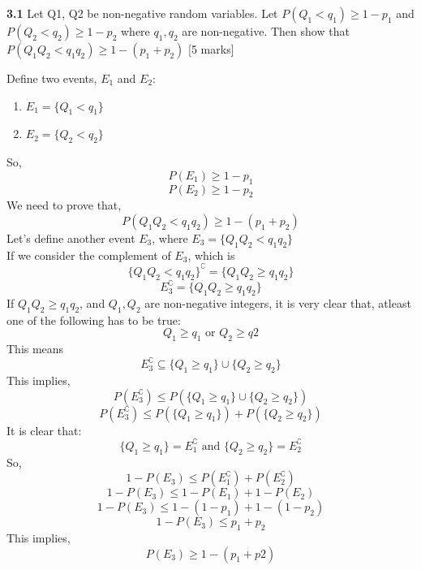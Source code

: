 \begin{que}
	\textbf{3.1} Let Q1, Q2 be non-negative random variables. Let $P(Q_1 < q_1) \geq 1-p_1$ and $P(Q_2 < q_2) \geq 1-p_2$
    where $q_1, q_2$ are non-negative. Then show that $P(Q_1Q_2 < q_1q_2) \geq 1 - (p_1 + p_2)$
	\hspace*{\fill} [5 marks]
\end{que}

\begin{tcolorbox}[breakable]
	\begin{sol}
        Define two events, $E_1$ and $E_2$: \\
        \begin{enumerate}
            \item $E_1=\{Q_1<q_1\}$
            \item $E_2=\{Q_2<q_2\}$
        \end{enumerate}
        So,
        \[P(E_1)\geq 1-p_1\]
        \[P(E_2)\geq 1-p_2\]
        We need to prove that,
        \[ P(Q_1Q_2 < q_1q_2) \geq 1 - (p_1 + p_2)\]
        Let's define another event $E_3$, where $E_3=\{Q_1Q_2 < q_1q_2\}$\\
        If we consider the complement of $E_3$, which is
        \[\{Q_1Q_2 < q_1q_2\}^\complement=\{Q_1Q_2 \geq q_1q_2\}\]
        \[E_3^\complement=\{Q_1Q_2 \geq q_1q_2\}\]
        \clearpage
        If $Q_1Q_2 \geq q_1q_2$, and $Q_1,Q_2$ are non-negative integers, it is very clear that, atleast one of the following has to be true:
        \[Q_1\geq q_1 \text{ or }Q_2\geq q2 \]
        This means \[E_3^\complement \subseteq \{Q_1\geq q_1\}\cup\{Q_2\geq q_2\} \]
        This implies,
        \[P(E_3^\complement)\leq P(\{Q_1\geq q_1\}\cup\{Q_2\geq q_2\} )\]
        \[P(E_3^\complement)\leq P(\{Q_1\geq q_1\})+P(\{Q_2\geq q_2\} )\]
        It is clear that:
        \[\{Q_1\geq q_1\} = E_1^\complement \text{ and } \{Q_2\geq q_2\} = E_2^\complement\]
        So,         
        \[1-P(E_3)\leq P(E_1^\complement) + P(E_2^\complement)\]
        \[1-P(E_3)\leq 1-P(E_1) + 1-P(E_2)\]
        \[1-P(E_3)\leq 1-(1-p_1) + 1-(1-p_2)\]
        \[1-P(E_3)\leq p_1 +p_2\]
        This implies,
        \[P(E_3)\geq 1-(p_1+p2)\]


    \end{sol}
\end{tcolorbox}